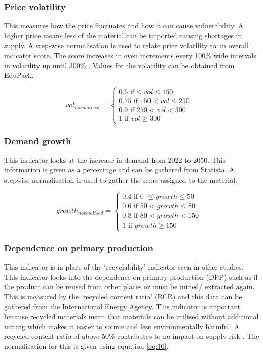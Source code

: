 \documentclass{article}
\begin{document}
\subsubsection{Price volatility} 

This measures how the price fluctuates and how it can cause vulnerability. A higher price means less of the material can be imported causing shortages in supply. A step-wise normalisation is used to relate price volatility to an overall indicator score. The score increases in even increments every 100\% wide intervals in volatility up until 300\% \cite{goddin2019identifying}. Values for the volatility can be obtained from EduPack.

\begin{equation}
vol_{normalised} =  \left\{\begin{matrix}
0.6 \text{ if} \leq vol \leq 150 & \\ 
0.75 \text{ if } 150 <  vol \leq 250  & \\ 
0.9 \text{ if }250 < vol < 300 & \\ 
1 \text{ if }vol \geq 300 & 
\end{matrix}\right.
\end{equation}

\subsubsection{Demand growth}

This indicator looks at the increase in demand from 2022 to 2050. This information is given as a percentage and can be gathered from Statista. A stepwise normalisation is used to gather the score assigned to the material. 

\begin{equation} growth_{normalised} =  \left\{\begin{matrix}
0.4 \text{ if 0 }  \leq growth \leq 50 & \\ 
0.6 \text{ if } 50 <  growth \leq 80  & \\ 
0.8 \text{ if }80 < growth < 150 & \\ 
1 \text{ if }growth \geq 150 & 
\end{matrix}\right.
\end{equation}

\subsubsection {Dependence on primary production}

This indicator is in place of the `recyclability' indicator seen in other studies. This indicator looks into the dependence on primary production (DPP) such as if the product can be reused from other places or must be mined/ extracted again. This is measured by the `recycled content ratio' (RCR) and this data can be gathered from the International Energy Agency. This indicator is important because recycled materials mean that materials can be utilised without additional mining which makes it easier to source and less environmentally harmful. A recycled content ratio of above 50\% contributes to no impact on supply risk \cite{bastein2014draft}. The normalisation for this is given using equation \ref{eq:10}.
\end{document}
